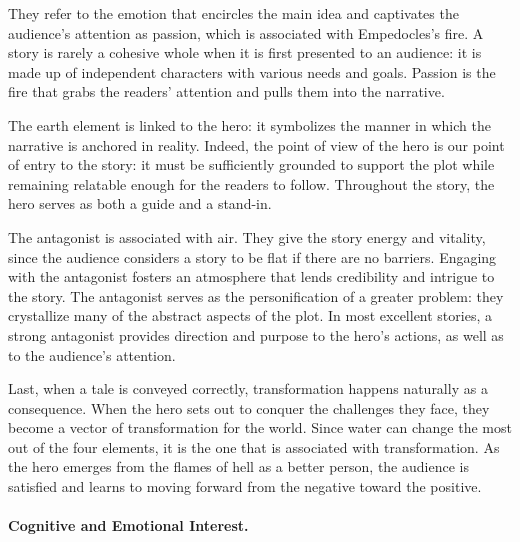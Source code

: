 They refer to the emotion that encircles the main idea and captivates the audience's attention as passion, which is associated with Empedocles's fire. A story is rarely a cohesive whole when it is first presented to an audience: it is made up of independent characters with various needs and goals. Passion is the fire that grabs the readers' attention and pulls them into the narrative.

The earth element is linked to the hero: it symbolizes the manner in which the narrative is anchored in reality. Indeed, the point of view of the hero is our point of entry to the story: it must be sufficiently grounded to support the plot while remaining relatable enough for the readers to follow. Throughout the story, the hero serves as both a guide and a stand-in.

The antagonist is associated with air. They give the story energy and vitality, since the audience considers a story to be flat if there are no barriers. Engaging with the antagonist fosters an atmosphere that lends credibility and intrigue to the story. The antagonist serves as the personification of a greater problem: they crystallize many of the abstract aspects of the plot. In most excellent stories, a strong antagonist provides direction and purpose to the hero's actions, as well as to the audience's attention.

Last, when a tale is conveyed correctly, transformation happens naturally as a consequence. When the hero sets out to conquer the challenges they face, they become a vector of transformation for the world. Since water can change the most out of the four elements, it is the one that is associated with transformation. As the hero emerges from the flames of hell as a better person, the audience is satisfied and learns to moving forward from the negative toward the positive.

\paragraph{Cognitive and Emotional Interest.}

